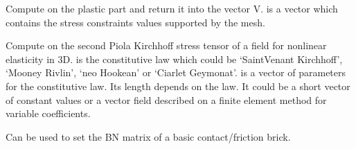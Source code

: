 \documentclass[a4paper,11pt,english]{sphinxmanual}
\begin{document}
\begin{fulllineitems}
\begin{fulllineitems}
\end{fulllineitems}


\begin{fulllineitems}
\label{\detokenize{python/cmdref_Model:getfem.Model.compute_plastic_part}}
Compute on  the plastic part and return it into the vector V.
 is a vector which contains the stress constraints values supported by the mesh.

\end{fulllineitems}


\begin{fulllineitems}
\label{\detokenize{python/cmdref_Model:getfem.Model.compute_second_Piola_Kirchhoff_tensor}}
Compute on  the second Piola Kirchhoff stress tensor of a field
for nonlinear elasticity in 3D.  is the constitutive law which
could be ‘SaintVenant Kirchhoff’, ‘Mooney Rivlin’, ‘neo Hookean’ or
‘Ciarlet Geymonat’.
 is a vector of parameters for the constitutive law. Its length
depends on the law. It could be a short vector of constant values or a
vector field described on a finite element method for variable
coefficients.

\end{fulllineitems}


\begin{fulllineitems}
\label{\detokenize{python/cmdref_Model:getfem.Model.contact_brick_set_BN}}
Can be used to set the BN matrix of a basic contact/friction brick.


\end{fulllineitems}
\end{fulllineitems}
\end{document}
